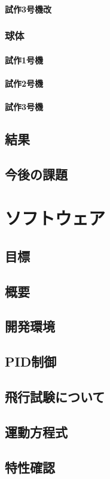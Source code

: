 \documentclass[12pt,oneside]{sotsuken_paper}
\begin{document}
\subsubsection{試作3号機改}
\subsection{球体}
\subsubsection{試作1号機}
\subsubsection{試作2号機}
\subsubsection{試作3号機}
\section{結果}
\section{今後の課題}

\chapter{ソフトウェア}
\section{目標}
\section{概要}
\section{開発環境}
\section{PID制御}
\section{飛行試験について}
\section{運動方程式}
\section{特性確認}
\end{document}
